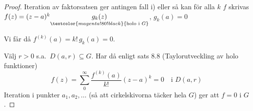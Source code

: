 \begin{proof}
Iteration av faktorsatsen ger antingen fall i) eller så kan för alla $k$ $f$ skrivas $f(z) = (z - a)^k \underset{\textcolor{magenta!80!black}{\text{holo i } G}}{g_k(z)}$, $g_k(a) = 0$

Vi får då $f^{(k)}(a) = k!\,g_k(a) = 0$.

Välj $r > 0$ s.a.\ $D(a, r) \subseteq G$. Har då enligt sats 8.8 (Taylorutveckling av holo funktioner)
\[ f(z) = \sum_0^\infty \frac{f^{(k)}(a)}{k!}(z - a)^k = 0 \quad \text{i } D(a, r) \]
Iteration i punkter $a_1, a_2, \dots$ \textcolor{magenta!80!black}{(så att cirkelskivorna täcker hela $G$)} ger att $f = 0$ i $G$.
\end{proof}
